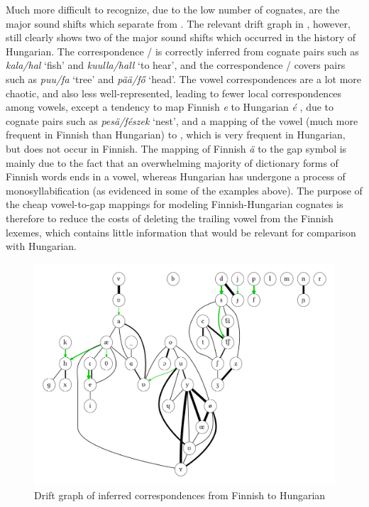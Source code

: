Much more difficult to recognize, due to the low number of cognates, are the major sound shifts which separate  from . The relevant drift graph in , however, still clearly shows two of the major sound shifts which occurred in the history of Hungarian. The correspondence \ipa{[k]}/\ipa{[h]} is correctly inferred from cognate pairs such as \textit{kala/hal} `fish' and \textit{kuulla/hall} `to hear', and the correspondence \ipa{[p]}/\ipa{[f]} covers pairs such as \textit{puu/fa} `tree' and \textit{p\"a\"a/f\H{o}} `head'. The vowel correspondences are a lot more chaotic, and also less well-represented, leading to fewer local correspondences among vowels, except a tendency to map Finnish \textit{e} \ipa{[E]} to Hungarian \textit{\'e} \ipa{[e]}, due to cognate pairs such as \textit{pes\"a/f\'eszek} `nest', and a mapping of the vowel \ipa{[u]} (much more frequent in Finnish than Hungarian) to \ipa{[6]}, which is very frequent in Hungarian, but does not occur 
in Finnish. The mapping of Finnish \textit{\"a} \ipa{[\ae]} to the gap symbol is mainly due to the fact that an overwhelming majority of dictionary forms of Finnish words ends in a vowel, whereas Hungarian has undergone a process of monosyllabification (as evidenced in some of the examples above). The purpose of the cheap vowel-to-gap mappings for modeling Finnish-Hungarian cognates is therefore to reduce the costs of deleting the trailing vowel from the Finnish lexemes, which contains little information that would be relevant for comparison with Hungarian.

\begin{figure}
    \includegraphics[width=\textwidth]{figures/drift-graph-fi-hu.pdf}
    \caption{Drift graph of inferred correspondences from Finnish to Hungarian}
    \label{fig:driftGraphFiHu}
\end{figure}

